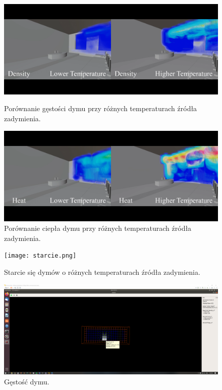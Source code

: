 \documentclass{article}
\begin{document}
	\begin{figure}[ht!]
		\centering
		\includegraphics[scale = 0.165]{3.png}
		\caption{Porównanie gęstości dymu przy różnych temperaturach źródła zadymienia.}
		
		\vspace{45mm}
		\includegraphics[scale = 0.165]{4.png}
		\caption{Porównanie ciepła dymu przy różnych temperaturach źródła zadymienia.}
	\end{figure}
	
	\pagebreak
	
	\begin{figure}[ht!]
		\centering
		\texttt{[image: starcie.png]}
		\caption{Starcie się dymów o różnych temperaturach źródła zadymienia.}
	\end{figure}
	
	\pagebreak
	
	\begin{figure}[ht!]
		\centering
		\medskip
		\medskip
		\medskip
		\includegraphics[scale = 0.165]{mgui_1.png}
		\caption{Gęstość dymu.}
	\end{figure}
	
\end{document}
